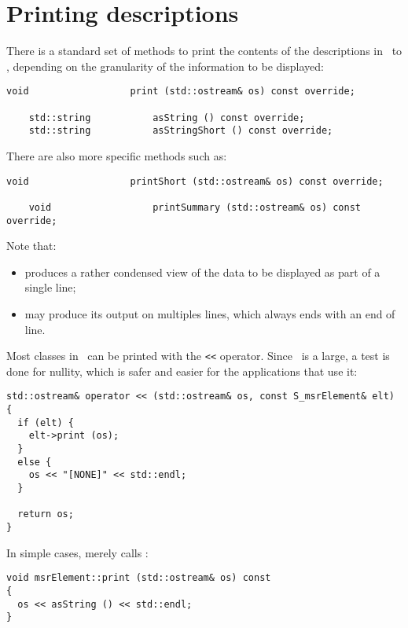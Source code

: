 \section{Printing descriptions}

There is a standard set of methods to print the contents of the descriptions in \mf\ to \standardOutput, depending on the granularity of the information to be displayed:
\begin{lstlisting}[language=CPlusPlus]
    void                  print (std::ostream& os) const override;

    std::string           asString () const override;
    std::string           asStringShort () const override;
\end{lstlisting}

There are also more specific methods such as:
\begin{lstlisting}[language=CPlusPlus]
    void                  printShort (std::ostream& os) const override;

    void                  printSummary (std::ostream& os) const override;
\end{lstlisting}

Note that:
\begin{itemize}
\item {} produces a rather condensed view of the data to be displayed as part of a single line;
\item {} may produce its output on multiples lines, which always ends with an end of line.
\end{itemize}

Most classes in \mf\ can be printed with the {\tt <<} operator. Since \mf\ is a large, a test is done for nullity, which is safer and easier for the applications that use it:
\begin{lstlisting}[language=CPlusPlus]
std::ostream& operator << (std::ostream& os, const S_msrElement& elt)
{
  if (elt) {
    elt->print (os);
  }
  else {
    os << "[NONE]" << std::endl;
  }

  return os;
}
\end{lstlisting}

In simple cases,  merely calls :
\begin{lstlisting}[language=CPlusPlus]
void msrElement::print (std::ostream& os) const
{
  os << asString () << std::endl;
}
\end{lstlisting}

